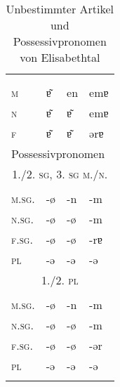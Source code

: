 \begin{table}[H]
	\caption{Unbestimmter Artikel und Possessivpronomen von Elisabethtal \citep[52]{Žirmunskij1928/29}}\label{table116}
	\begin{tabular}{llll}
		\lsptoprule
		\multicolumn{4}{l}{unbestimmter Artikel}\\
		& \NOM & \AKK & \DAT\\\midrule
		 \textsc{m} & ɐ͂ & en & emɐ\\
		 \textsc{n} & ɐ͂ & ɐ͂ & emɐ\\
		 \textsc{f} & ɐ͂ & ɐ͂ & ǝrɐ\\ \midrule
		\multicolumn{4}{l}{Possessivpronomen}\\
		\multicolumn{4}{c}{\scshape 1./2. \textsc{sg}, 3. \textsc{sg} m./n.}  \\\cmidrule(lr){1-4}
		& \NOM & \AKK & \DAT\\\midrule
		\textsc{m.sg.} & {}-ø & {}-n & {}-m\\
		\textsc{n.sg.} & {}-ø & {}-ø & {}-m\\
		\textsc{f.sg.} & {}-ø & {}-ø & {}-rɐ\\
		\textsc{pl} & {}-ǝ & {}-ǝ & {}-ǝ\\ \midrule
		\multicolumn{4}{c}{\scshape 1./2. \textsc{pl}}  \\\cmidrule(lr){1-4}
		& \NOM & \AKK & \DAT\\\midrule
		\textsc{m.sg.} & {}-ø & {}-n & {}-m\\
		\textsc{n.sg.} & {}-ø & {}-ø & {}-m\\
		\textsc{f.sg.} & {}-ø & {}-ø & {}-ǝr\\
		\textsc{pl} & {}-ǝ & {}-ǝ & {}-ǝ\\
		\lspbottomrule
	\end{tabular}
\end{table}


